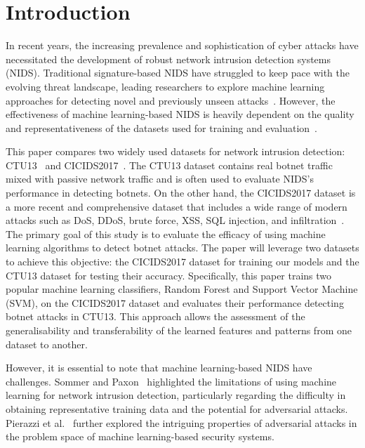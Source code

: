 \chapter{Introduction}

In recent years, the increasing prevalence and sophistication of cyber attacks have necessitated the development of robust network intrusion detection systems (NIDS). Traditional signature-based NIDS have struggled to keep pace with the evolving threat landscape, leading researchers to explore machine learning approaches for detecting novel and previously unseen attacks~\cite{marchetti2016analysis}. However, the effectiveness of machine learning-based NIDS is heavily dependent on the quality and representativeness of the datasets used for training and evaluation~\cite{engelen2021troubleshooting}.

This paper compares two widely used datasets for network intrusion detection: CTU13~\cite{garcia2014empirical} and CICIDS2017~\cite{sharafaldin2018toward}. The CTU13 dataset contains real botnet traffic mixed with passive network traffic and is often used to evaluate NIDS's performance in detecting botnets. On the other hand, the CICIDS2017 dataset is a more recent and comprehensive dataset that includes a wide range of modern attacks such as DoS, DDoS, brute force, XSS, SQL injection, and infiltration~\cite{sharafaldin2018toward}. The primary goal of this study is to evaluate the efficacy of using machine learning algorithms to detect botnet attacks. The paper will leverage two datasets to achieve this objective: the CICIDS2017 dataset for training our models and the CTU13 dataset for testing their accuracy. Specifically, this paper trains two popular machine learning classifiers, Random Forest and Support Vector Machine (SVM), on the CICIDS2017 dataset and evaluates their performance detecting botnet attacks in CTU13. This approach allows the assessment of the generalisability and transferability of the learned features and patterns from one dataset to another.

However, it is essential to note that machine learning-based NIDS have challenges. Sommer and Paxon~\cite{sommer2010outside} highlighted the limitations of using machine learning for network intrusion detection, particularly regarding the difficulty in obtaining representative training data and the potential for adversarial attacks. Pierazzi et al.~\cite{pierazzi2020intriguing} further explored the intriguing properties of adversarial attacks in the problem space of machine learning-based security systems.

